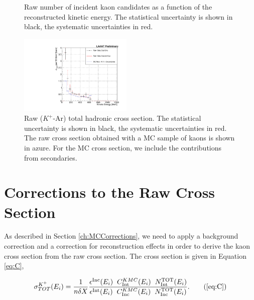 \begin{figure}[]
\begin{minipage}[t]{0.45\textwidth}
\caption{Raw number of incident kaon candidates as a function of the reconstructed kinetic energy. The statistical uncertainty is shown in black, the systematic uncertainties in red.}
\label{fig:IncidentRawK}
\end{minipage}
\end{figure}



\begin{figure}
\centering  
\includegraphics[width=0.48\textwidth]{Chapter-7/Images/Plots_MCData_XS_StatSystK_WithDK.pdf}
\caption{Raw ($K^+$-Ar) total hadronic cross section. The statistical uncertainty is shown in black, the systematic uncertainties in red. The raw cross section obtained with a MC sample of kaons is shown in azure. For the MC cross section,  we include the contributions from secondaries. }
\label{fig:XSRawK}
\end{figure}


\section{Corrections to the Raw Cross Section}\label{ch:KaonXSCorrections}
As described in Section \ref{ch:MCCorrections}, we need to apply a background correction and a correction for reconstruction effects in order to derive the  kaon cross section from the raw cross section.  The  cross section is given in Equation \ref{eq:C}, 

\begin{equation}
   \sigma^{K^+}_{TOT}(E_{i})  = \frac{1}{n \delta X}\frac{ \epsilon^{\text{Inc}}(E_i)  \hspace{0.2cm} C^{K MC}_{\text{Int}} (E_{i}) \hspace{0.2cm} N^{\text{TOT}}_{\text{Int}} (E_{i}) }{   \epsilon^{\text{Int}}(E_i) \hspace{0.2cm} C^{K MC}_{\text{Inc}} (E_{i}) \hspace{0.2cm}  N^{\text{TOT}}_{\text{Inc}} (E_{i})}.
 \tag{\ref{eq:C}}
\end{equation}

